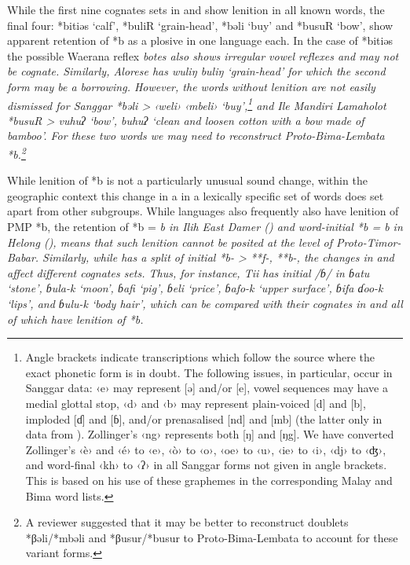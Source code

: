 While the first nine cognates sets in 
and  show lenition in all known  words,
the final four: *bitiəs ‘calf’,
*buliR ‘grain-head’, *bəli ‘buy’
and *busuR ‘bow’, show apparent retention of *b as a plosive
in one language each.
In the case of *bitiəs the possible Waerana reflex \it{botes}
also shows irregular vowel reflexes
and may not be cognate.
Similarly, Alorese has \it{wuliŋ} {\tl} \it{buliŋ} ‘grain-head’
for which the second form may be a borrowing.
However, the words without lenition are not easily dismissed
for Sanggar *bəli > ‹\it{weli}› \it{{\tl} ‹mbeli}› ‘buy’,\footnote{
		Angle brackets indicate transcriptions which follow the source where
		the exact phonetic form is in doubt.
		The following issues, in particular,
		occur in Sanggar data: ‹e› may represent [ə] and/or [e],
		vowel sequences may have a medial glottal stop,
		‹d› and ‹b› may represent plain-voiced [d]
		and [b], imploded [ɗ]
		and [ɓ], and/or prenasalised [nd]
		and [mb] (the latter only in data from \citealt{Zollinger1850}).
		Zollinger’s ‹ng› represents both [ŋ] and [ŋg].
		We have converted Zollinger’s ‹è›
		and ‹é› to ‹e›,
		‹ò› to ‹o›, ‹oe› to ‹u›,
		‹ie› to ‹i›, ‹dj› to ‹ʤ›,
		and word-final ‹kh› to ‹ʔ› in all Sanggar forms not
		given in angle brackets.
		This is based on his use of these graphemes in the corresponding
		Malay and Bima word lists.}
and Ile Mandiri Lamaholot *busuR > \it{vuhuʔ} ‘bow’,
\it{buhuʔ} ‘clean and loosen cotton with a bow made of bamboo’.
For these two words we may need to reconstruct Proto-Bima-Lembata
*b.\footnote{
		A reviewer suggested that it may be better to reconstruct
		doublets *βəli/*mbəli and *βusur/*busur to Proto-Bima-Lembata to account for these
		variant forms.} 

While lenition of *b is not a particularly unusual sound change,
within the geographic context this change in a in a lexically specific set of words
does set  apart from other subgroups.
While  languages also frequently also have lenition
of PMP *b, the retention of *b = \it{b} in Ilih East Damer ()
and word-initial *b = \it{b} in Helong (),
means that such lenition cannot be posited at the level of Proto-Timor-Babar.
Similarly, while  has a split of initial *b- >
**f-, **b-, the changes in 
and  affect different cognates sets.
Thus, for instance, Tii has initial /ɓ/ in \it{ɓatu} ‘stone’,
\it{ɓula-k} ‘moon’, \it{ɓafi} ‘pig’,
\it{ɓeli} ‘price’, \it{ɓafo-k} ‘upper surface’, \it{ɓifa ɗoo-k}
‘lips’, and \it{ɓulu-k} ‘body hair’, which can be compared with their
 cognates in 
and  all of which have lenition of *b.

